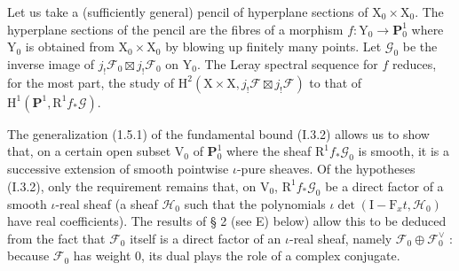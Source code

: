 \documentclass[11pt,leqno]{article}
\begin{document}
Let us take a (sufficiently general) pencil of hyperplane sections of \(\mathrm{X}_0\times\mathrm{X}_0\). The hyperplane sections of the pencil are the fibres of a morphism \(f:\mathrm{Y}_0\to\mathbf{P}_0^1\) where \(\mathrm{Y}_0\) is obtained from \(\mathrm{X}_0\times\mathrm{X}_0\) by blowing up finitely many points. Let \(\mathscr{G}_0\) be the inverse image of \(j_!\mathscr{F}_0\boxtimes j_!\mathscr{F}_0\) on \(\mathrm{Y}_0\). The Leray spectral sequence for \(f\) reduces, for the most part, the study of \(\mathrm{H}^2(\mathrm{X}\times\mathrm{X},j_!\mathscr{F}\boxtimes j_!\mathscr{F})\) to that of \(\mathrm{H}^1(\mathbf{P}^1,\mathrm{R}^1 f_*\mathscr{G})\).

The generalization (1.5.1) of the fundamental bound (I.3.2) allows us to show that, on a certain open subset \(\mathrm{V}_0\) of \(\mathbf{P}_0^1\) where the sheaf \(\mathrm{R}^1 f_*\mathscr{G}_0\) is smooth, it is a successive extension of smooth pointwise \(\iota\)-pure sheaves. Of the hypotheses (I.3.2), only the requirement remains that, on \(\mathrm{V}_0\), \(\mathrm{R}^1 f_*\mathscr{G}_0\) be a direct factor of a smooth \(\iota\)-real sheaf (a sheaf \(\mathscr{H}_0\) such that the polynomials \(\iota\det(\mathrm{I}-\mathrm{F}_x t,\mathscr{H}_0)\) have real coefficients). The results of § 2 (see E) below) allow this to be deduced from the fact that \(\mathscr{F}_0\) itself is a direct factor of an \(\iota\)-real sheaf, namely \(\mathscr{F}_0\oplus\mathscr{F}_0^\vee\) : because \(\mathscr{F}_0\) has weight 0, its dual plays the role of a complex conjugate.
\end{document}
